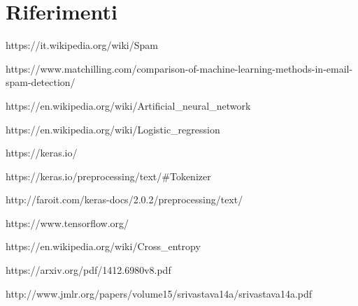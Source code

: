 \section*{Riferimenti}
https://it.wikipedia.org/wiki/Spam

https://www.matchilling.com/comparison-of-machine-learning-methods-in-email-spam-detection/

https://en.wikipedia.org/wiki/Artificial\_neural\_network 

https://en.wikipedia.org/wiki/Logistic\_regression

https://keras.io/

https://keras.io/preprocessing/text/\#Tokenizer

http://faroit.com/keras-docs/2.0.2/preprocessing/text/

https://www.tensorflow.org/

https://en.wikipedia.org/wiki/Cross\_entropy

https://arxiv.org/pdf/1412.6980v8.pdf

http://www.jmlr.org/papers/volume15/srivastava14a/srivastava14a.pdf